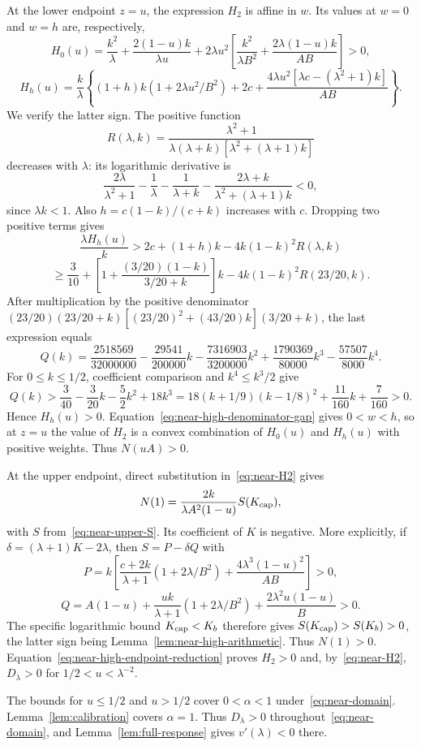 At the lower endpoint $z=u$, the expression $H_2$ is affine in $w$. Its values at $w=0$ and $w=h$ are, respectively,
\[
 H_0(u)=\frac{k^2}{\lambda}+\frac{2(1-u)k}{\lambda u}
       +2\lambda u^2\left[\frac{k^2}{\lambda B^2}
                              +\frac{2\lambda(1-u)k}{AB}\right]>0,
\]
\[
 H_h(u)=\frac k\lambda\left\{(1+h)k(1+2\lambda u^2/B^2)+2c
       +\frac{4\lambda u^2[\lambda c-(\lambda^2+1)k]}{AB}\right\}.
\]
We verify the latter sign. The positive function
\[
 R(\lambda,k)=\frac{\lambda^2+1}{\lambda(\lambda+k)[\lambda^2+(\lambda+1)k]}
\]
decreases with $\lambda$: its logarithmic derivative is
\[
 \frac{2\lambda}{\lambda^2+1}-\frac1\lambda-\frac1{\lambda+k}
                        -\frac{2\lambda+k}{\lambda^2+(\lambda+1)k}<0,
\]
since $\lambda k<1$. Also $h=c(1-k)/(c+k)$ increases with $c$. Dropping two positive terms gives
\[
 \frac{\lambda H_h(u)}k>
 2c+(1+h)k-4k(1-k)^2R(\lambda,k)
\]
\[
 \ge\frac3{10}+\left[1+\frac{(3/20)(1-k)}{3/20+k}\right]k
       -4k(1-k)^2R(23/20,k).
\]
After multiplication by the positive denominator
$(23/20)(23/20+k)[(23/20)^2+(43/20)k](3/20+k)$, the last expression equals
\[
 Q(k)=\frac{2518569}{32000000}-\frac{29541}{200000}k
 -\frac{7316903}{3200000}k^2+\frac{1790369}{80000}k^3-\frac{57507}{8000}k^4.
\]
For $0\le k\le1/2$, coefficient comparison and $k^4\le k^3/2$ give
\[
 Q(k)>\frac3{40}-\frac3{20}k-\frac52k^2+18k^3
 =18(k+1/9)(k-1/8)^2+\frac{11}{160}k+\frac7{160}>0.
\]
Hence $H_h(u)>0$. Equation~\eqref{eq:near-high-denominator-gap} gives $0<w<h$, so at $z=u$ the value of $H_2$ is a convex combination of $H_0(u)$ and $H_h(u)$ with positive weights. Thus $N(uA)>0$.

At the upper endpoint, direct substitution in~\eqref{eq:near-H2} gives
\[
 N(1)=\frac{2k}{\lambda A^2(1-u)}S(K_{\rm cap}),
\]
with $S$ from~\eqref{eq:near-upper-S}. Its coefficient of $K$ is negative. More explicitly, if $\delta=(\lambda+1)K-2\lambda$, then $S=P-\delta Q$ with
\[
 P=k\left[\frac{c+2k}{\lambda+1}(1+2\lambda/B^2)
                     +\frac{4\lambda^3(1-u)^2}{AB}\right]>0,
\]
\[
 Q=A(1-u)+\frac{uk}{\lambda+1}(1+2\lambda/B^2)
                          +\frac{2\lambda^2u(1-u)}B>0.
\]
The specific logarithmic bound $K_{\rm cap}<K_b$ therefore gives
$S(K_{\rm cap})>S(K_b)>0$, the latter sign being Lemma~\ref{lem:near-high-arithmetic}. Thus $N(1)>0$.
Equation~\eqref{eq:near-high-endpoint-reduction} proves $H_2>0$ and, by~\eqref{eq:near-H2}, $D_\lambda>0$ for $1/2<u<\lambda^{-2}$.

The bounds for $u\le1/2$ and $u>1/2$ cover $0<\alpha<1$ under~\eqref{eq:near-domain}. Lemma~\ref{lem:calibration} covers $\alpha=1$. Thus $D_\lambda>0$ throughout~\eqref{eq:near-domain}, and Lemma~\ref{lem:full-response} gives $v'(\lambda)<0$ there.
